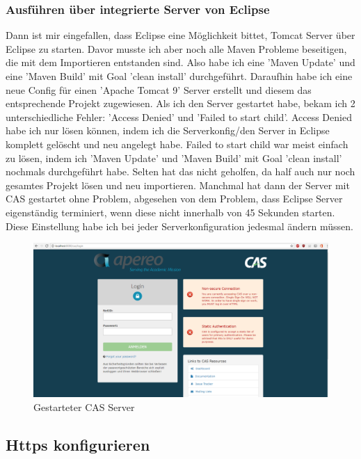 \subsubsection{Ausführen über integrierte Server von Eclipse}

Dann ist mir eingefallen, dass Eclipse eine Möglichkeit bittet, Tomcat Server über Eclipse zu starten. 
\newline
Davor musste ich aber noch alle Maven Probleme beseitigen, die mit dem Importieren entstanden sind. Also habe ich eine 'Maven Update' und eine 'Maven Build' mit Goal 'clean install' durchgeführt. Daraufhin habe ich eine neue Config für einen 'Apache Tomcat 9' Server erstellt und diesem das entsprechende Projekt zugewiesen.
\newline
Als ich den Server gestartet habe, bekam ich 2 unterschiedliche Fehler: 'Access Denied' und 'Failed to start child'.
\newline
Access Denied habe ich nur lösen können, indem ich die Serverkonfig/den Server in Eclipse komplett gelöscht und neu angelegt habe.
\newline
Failed to start child war meist einfach zu lösen, indem ich 'Maven Update' und 'Maven Build' mit Goal 'clean install' nochmals durchgeführt habe. Selten hat das nicht geholfen, da half auch nur noch gesamtes Projekt lösen und neu importieren.
\newline
Manchmal hat dann der Server mit CAS gestartet ohne Problem, abgesehen von dem Problem, dass Eclipse Server eigenständig terminiert, wenn diese nicht innerhalb von 45 Sekunden starten. Diese Einstellung habe ich bei jeder Serverkonfiguration jedesmal ändern müssen.

\begin{figure}[h]
\centering
\includegraphics[width=0.7\linewidth]{images/bildCool}
\caption{Gestarteter CAS Server}
\label{fig:bildcool}
\end{figure}


\subsection{Https konfigurieren}

